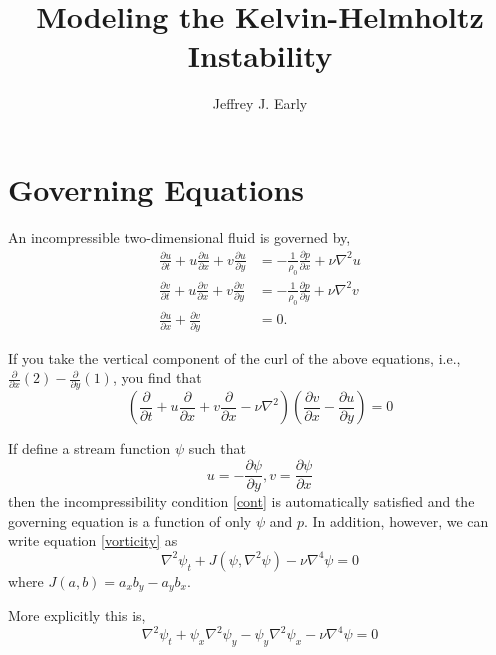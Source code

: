 \documentclass[11pt]{amsart}
\title{Modeling the Kelvin-Helmholtz Instability}
\author{Jeffrey J. Early}
\begin{document}
\maketitle

\section{Governing Equations}

An incompressible two-dimensional fluid is governed by,
\begin{align}
\label{x-mom}
\frac{\partial u}{\partial t} + u \frac{\partial u}{\partial x} + v \frac{\partial u}{\partial y} &= -\frac{1}{\rho_0} \frac{\partial p}{\partial x} + \nu \nabla^2 u\\
\label{y-mom}
\frac{\partial v}{\partial t} + u \frac{\partial v}{\partial x} + v \frac{\partial v}{\partial y} &= -\frac{1}{\rho_0} \frac{\partial p}{\partial y} + \nu \nabla^2 v\\
\label{cont}
\frac{\partial u}{\partial x} + \frac{\partial v}{\partial y} &= 0.
\end{align}

If you take the vertical component of the curl of the above equations, i.e., $\frac{\partial}{\partial x} (2) - \frac{\partial}{\partial y} (1)$, you find that
\begin{equation}
\label{vorticity}
\left( \frac{\partial}{\partial t} + u\frac{\partial}{\partial x} + v\frac{\partial}{\partial x} - \nu \nabla^2 \right)\left( \frac{\partial v}{\partial x} - \frac{\partial u}{\partial y} \right) = 0
\end{equation}

If define a stream function $\psi$ such that
\begin{equation}
u = - \frac{\partial \psi}{\partial y}, v = \frac{\partial \psi}{\partial x}
\end{equation}
then the incompressibility condition \ref{cont} is automatically satisfied and the governing equation is a function of only $\psi$ and $p$. In addition, however, we can write equation \ref{vorticity} as
\begin{equation}
\nabla^2 \psi_t + J \left( \psi, \nabla^2 \psi \right) - \nu \nabla^4 \psi = 0
\end{equation}
where $J(a, b) = a_x b_y - a_y b_x$.

More explicitly this is,
\begin{equation}
\nabla^2 \psi_t + \psi_x \nabla^2 \psi_y - \psi_y \nabla^2 \psi_x - \nu \nabla^4 \psi = 0
\end{equation}
\end{document}
